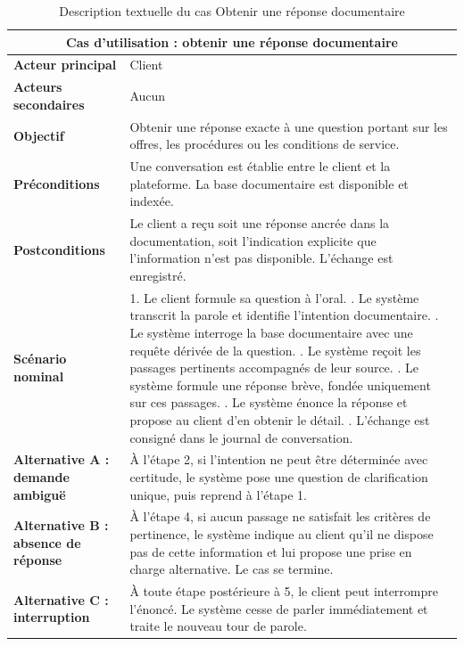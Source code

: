 \begin{table}[H]
\centering
\renewcommand{\arraystretch}{1.25}
\begin{tabular}{|p{3.0cm}|p{11.5cm}|}
\hline
\multicolumn{2}{|c|}{\textbf{Cas d'utilisation : obtenir une réponse documentaire}} \\
\hline
\textbf{Acteur principal} & Client \\
\hline
\textbf{Acteurs secondaires} & Aucun \\
\hline
\textbf{Objectif} & Obtenir une réponse exacte à une question portant sur les offres, les procédures ou les conditions de service. \\
\hline
\textbf{Préconditions} & Une conversation est établie entre le client et la plateforme. La base documentaire est disponible et indexée. \\
\hline
\textbf{Postconditions} & Le client a reçu soit une réponse ancrée dans la documentation, soit l'indication explicite que l'information n'est pas disponible. L'échange est enregistré. \\
\hline
\textbf{Scénario nominal} &
1. Le client formule sa question à l'oral. \newline
2. Le système transcrit la parole et identifie l'intention documentaire. \newline
3. Le système interroge la base documentaire avec une requête dérivée de la question. \newline
4. Le système reçoit les passages pertinents accompagnés de leur source. \newline
5. Le système formule une réponse brève, fondée uniquement sur ces passages. \newline
6. Le système énonce la réponse et propose au client d'en obtenir le détail. \newline
7. L'échange est consigné dans le journal de conversation. \\
\hline
\textbf{Alternative A : demande ambiguë} & À l'étape 2, si l'intention ne peut être déterminée avec certitude, le système pose une question de clarification unique, puis reprend à l'étape 1. \\
\hline
\textbf{Alternative B : absence de réponse} & À l'étape 4, si aucun passage ne satisfait les critères de pertinence, le système indique au client qu'il ne dispose pas de cette information et lui propose une prise en charge alternative. Le cas se termine. \\
\hline
\textbf{Alternative C : interruption} & À toute étape postérieure à 5, le client peut interrompre l'énoncé. Le système cesse de parler immédiatement et traite le nouveau tour de parole. \\
\hline
\end{tabular}
\caption{Description textuelle du cas Obtenir une réponse documentaire}
\label{tab:cu-doc}
\end{table}

